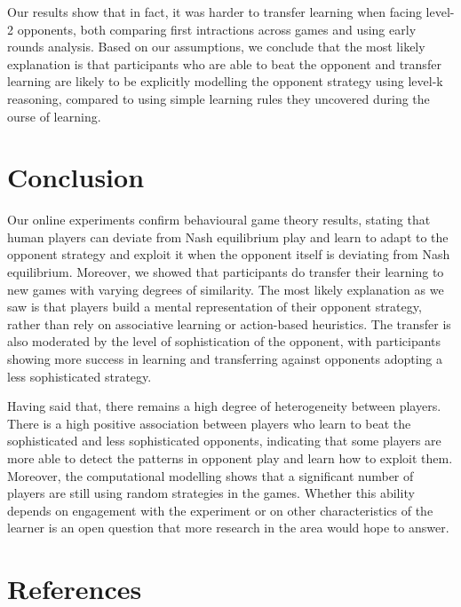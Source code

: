 \documentclass[man,floatsintext]{apa6}
\begin{document}
Our results show that in fact, it was harder to transfer learning when facing level-2 opponents, both comparing first intractions across games and using early rounds analysis. Based on our assumptions, we conclude that the most likely explanation is that participants who are able to beat the opponent and transfer learning are likely to be explicitly modelling the opponent strategy using level-k reasoning, compared to using simple learning rules they uncovered during the ourse of learning.

\newpage

\hypertarget{conclusion}{%
\section{Conclusion}\label{conclusion}}

Our online experiments confirm behavioural game theory results, stating that human players can deviate from Nash equilibrium play and learn to adapt to the opponent strategy and exploit it when the opponent itself is deviating from Nash equilibrium. Moreover, we showed that participants do transfer their learning to new games with varying degrees of similarity. The most likely explanation as we saw is that players build a mental representation of their opponent strategy, rather than rely on associative learning or action-based heuristics. The transfer is also moderated by the level of sophistication of the opponent, with participants showing more success in learning and transferring against opponents adopting a less sophisticated strategy.

Having said that, there remains a high degree of heterogeneity between players. There is a high positive association between players who learn to beat the sophisticated and less sophisticated opponents, indicating that some players are more able to detect the patterns in opponent play and learn how to exploit them. Moreover, the computational modelling shows that a significant number of players are still using random strategies in the games. Whether this ability depends on engagement with the experiment or on other characteristics of the learner is an open question that more research in the area would hope to answer.

\newpage

\hypertarget{references}{%
\section{References}\label{references}}
\end{document}
